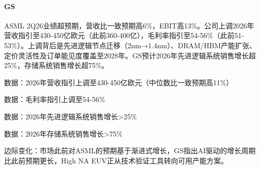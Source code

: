 \documentclass[11pt]{ctexart}
\begin{document}
\paragraph{GS} ASML 2Q26业绩超预期，营收比一致预期高6\%，EBIT高13\%。公司上调2026年营收指引至430-450亿欧元（此前360-400亿），毛利率指引至54-56\%（此前51-53\%）。上调背后是先进逻辑节点迁移（2nm→1.4nm）、DRAM/HBM产能扩张、定价灵活性及订单能见度覆盖至2028年。GS预计2026年先进逻辑系统销售增长超25\%，存储系统销售增长超75\%。
{\small\color{refgray}数据：2026年营收指引上调至430-450亿欧元（中位数比一致预期高11\%）\par}
{\small\color{refgray}数据：毛利率指引上调至54-56\%\par}
{\small\color{refgray}数据：2026年先进逻辑系统销售增长>25\%\par}
{\small\color{refgray}数据：2026年存储系统销售增长>75\%\par}
{\small\color{refgray}边际变化：市场此前对ASML的预期基于渐进式增长，GS指出AI驱动的增长周期比此前预期更长，High NA EUV正从技术验证工具转向可用产能方案。\par}
\end{document}
